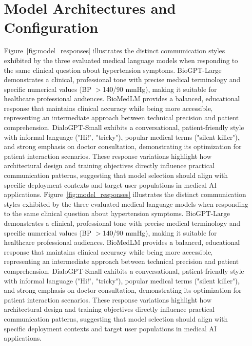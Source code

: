 \documentclass[conference]{IEEEtran}
\begin{document}
\section{Model Architectures and Configuration}




Figure~\ref{fig:model_responses} illustrates the distinct communication styles exhibited by the three evaluated medical language models when responding to the same clinical question about hypertension symptoms. BioGPT-Large demonstrates a clinical, professional tone with precise medical terminology and specific numerical values (BP $>$140/90 mmHg), making it suitable for healthcare professional audiences. BioMedLM provides a balanced, educational response that maintains clinical accuracy while being more accessible, representing an intermediate approach between technical precision and patient comprehension. DialoGPT-Small exhibits a conversational, patient-friendly style with informal language ("Hi!", "tricky"), popular medical terms ("silent killer"), and strong emphasis on doctor consultation, demonstrating its optimization for patient interaction scenarios. These response variations highlight how architectural design and training objectives directly influence practical communication patterns, suggesting that model selection should align with specific deployment contexts and target user populations in medical AI applications.
Figure~\ref{fig:model_responses} illustrates the distinct communication styles exhibited by the three evaluated medical language models when responding to the same clinical question about hypertension symptoms. BioGPT-Large demonstrates a clinical, professional tone with precise medical terminology and specific numerical values (BP $>$140/90 mmHg), making it suitable for healthcare professional audiences. BioMedLM provides a balanced, educational response that maintains clinical accuracy while being more accessible, representing an intermediate approach between technical precision and patient comprehension. DialoGPT-Small exhibits a conversational, patient-friendly style with informal language ("Hi!", "tricky"), popular medical terms ("silent killer"), and strong emphasis on doctor consultation, demonstrating its optimization for patient interaction scenarios. These response variations highlight how architectural design and training objectives directly influence practical communication patterns, suggesting that model selection should align with specific deployment contexts and target user populations in medical AI applications.
\end{document}

